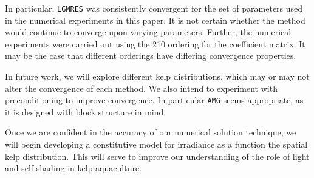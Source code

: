 \documentclass[10pt]{article}
\begin{document}
\begin{multicols}{2}
In particular, \texttt{LGMRES} was consistently convergent for the set of parameters used in the numerical experiments in this paper.
It is not certain whether the method would continue to converge upon varying parameters.
Further, the numerical experiments were carried out using the 210 ordering for the coefficient matrix.
It may be the case that different orderings have differing convergence properties.

In future work, we will explore different kelp distributions, which may or may not alter the convergence of each method.
We also intend to experiment with preconditioning to improve convergence.
In particular \texttt{AMG} seems appropriate, as it is designed with block structure in mind.

Once we are confident in the accuracy of our numerical solution technique, we will begin developing a constitutive model for irradiance as a function the spatial kelp distribution.
This will serve to improve our understanding of the role of light and self-shading in kelp aquaculture.
\vspace{-1em}



\end{multicols}
\end{document}
